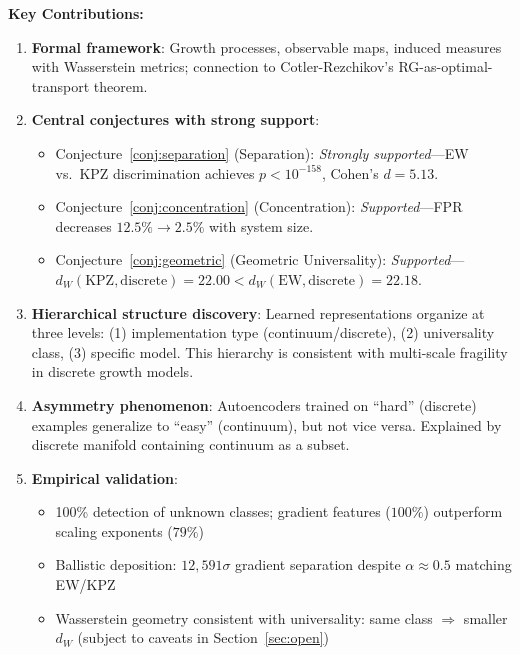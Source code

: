 \documentclass[aps,pre,reprint,amsmath,amssymb,superscriptaddress]{revtex4-2}
\newcommand{\EW}{\text{EW}}
\newcommand{\KPZ}{\text{KPZ}}
\begin{document}
\textbf{Key Contributions:}
\begin{enumerate}
\item \textbf{Formal framework}: Growth processes, observable maps, induced measures with Wasserstein metrics; connection to Cotler-Rezchikov's RG-as-optimal-transport theorem.

\item \textbf{Central conjectures with strong support}:
\begin{itemize}
\item Conjecture~\ref{conj:separation} (Separation): \emph{Strongly supported}---EW vs.~KPZ discrimination achieves $p < 10^{-158}$, Cohen's $d = 5.13$.
\item Conjecture~\ref{conj:concentration} (Concentration): \emph{Supported}---FPR decreases $12.5\% \to 2.5\%$ with system size.
\item Conjecture~\ref{conj:geometric} (Geometric Universality): \emph{Supported}---$d_W(\KPZ, \text{discrete}) = 22.00 < d_W(\EW, \text{discrete}) = 22.18$.
\end{itemize}

\item \textbf{Hierarchical structure discovery}: Learned representations organize at three levels: (1) implementation type (continuum/discrete), (2) universality class, (3) specific model. This hierarchy is consistent with multi-scale fragility in discrete growth models.

\item \textbf{Asymmetry phenomenon}: Autoencoders trained on ``hard'' (discrete) examples generalize to ``easy'' (continuum), but not vice versa. Explained by discrete manifold containing continuum as a subset.

\item \textbf{Empirical validation}:
\begin{itemize}
\item 100\% detection of unknown classes; gradient features ($100\%$) outperform scaling exponents ($79\%$)
\item Ballistic deposition: $12{,}591\sigma$ gradient separation despite $\alpha \approx 0.5$ matching EW/KPZ
\item Wasserstein geometry consistent with universality: same class $\Rightarrow$ smaller $d_W$ (subject to caveats in Section~\ref{sec:open})
\end{itemize}
\end{enumerate}
\end{document}

